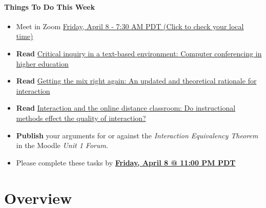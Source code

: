 \documentclass[
]{book}
\providecommand{\tightlist}{%
  \setlength{\itemsep}{0pt}\setlength{\parskip}{0pt}}
\begin{document}
\begin{todo}
\hypertarget{things-to-do-this-week}{%
\paragraph{Things To Do This Week}\label{things-to-do-this-week}}

\begin{itemize}
\tightlist
\item
  Meet in Zoom
  \href{https://www.timeanddate.com/worldclock/fixedtime.html?msg=LDRS663+Meeting\&iso=20220408T0730\&p1=1109\&ah=1\&am=30}{Friday,
  April 8 - 7:30 AM PDT (Click to check your local time)}\\
\item
  \textbf{Read}
  \href{https://www-sciencedirect-com.twu.idm.oclc.org/science/article/pii/S1096751600000166}{Critical
  inquiry in a text-based environment: Computer conferencing in higher
  education}\\
\item
  \textbf{Read}
  \href{http://www.irrodl.org/index.php/irrodl/article/view/149/230}{Getting
  the mix right again: An updated and theoretical rationale for
  interaction}\\
\item
  \textbf{Read}
  \href{https://link-springer-com.ezproxy.student.twu.ca/article/10.1007/s12528-011-9049-4}{Interaction
  and the online distance classroom: Do instructional methods effect the
  quality of interaction?}\\
\item
  \textbf{Publish} your arguments for or against the \emph{Interaction
  Equivalency Theorem} in the Moodle \emph{Unit 1 Forum}.\\
\item
  Please complete these tasks by
  \href{https://www.timeanddate.com/worldclock/fixedtime.html?msg=LDRS663+Meeting\&iso=20220408T2300\&p1=1109\&ah=1\&am=30}{\textbf{Friday,
  April 8 @ 11:00 PM PDT}}
\end{itemize}
\end{todo}

\hypertarget{overview-1}{%
\section*{Overview}\label{overview-1}}
\end{document}
